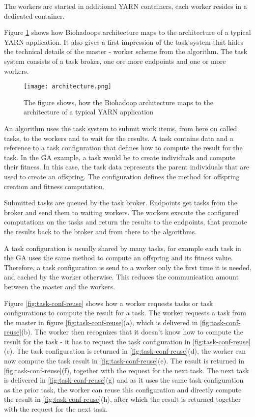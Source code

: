 The workers are started in additional YARN containers, each worker resides in a dedicated container.

Figure \ref{fig:architecture} shows how Biohadoops architecture maps to the architecture of a typical YARN application. It also gives a first impression of the task system that hides the technical details of the master - worker scheme from the algorithm. The task system consists of a task broker, one ore more endpoints and one or more workers.

\begin{figure}[ht!]
  \centering
  \texttt{[image: architecture.png]}
  \caption{The figure shows, how the Biohadoop architecture maps to the architecture of a typical YARN application}
  \label{fig:architecture}
\end{figure}

An algorithm uses the task system to submit work items, from here on called tasks, to the workers and to wait for the results. A task contains data and a reference to a task configuration that defines how to compute the result for the task. In the GA example, a task would be to create individuals and compute their fitness. In this case, the task data represents the parent individuals that are used to create an offspring. The configuration defines the method for offspring creation and fitness computation.

Submitted tasks are queued by the task broker. Endpoints get tasks from the broker and send them to waiting workers. The workers execute the configured computations on the tasks and return the results to the endpoints, that promote the results back to the broker and from there to the algorithms.

A task configuration is usually shared by many tasks, for example each task in the GA uses the same method to compute an offspring and its fitness value. Therefore, a task configuration is send to a worker only the first time it is needed, and cached by the worker otherwise. This reduces the communication amount between the master and the workers.

Figure \ref{fig:task-conf-reuse} shows how a worker requests tasks or task configurations to compute the result for a task. The worker requests a task from the master in figure \ref{fig:task-conf-reuse}(a), which is delivered in \ref{fig:task-conf-reuse}(b). The worker then recognizes that it doesn't know how to compute the result for the task - it has to request the task configuration in \ref{fig:task-conf-reuse}(c). The task configuration is returned in \ref{fig:task-conf-reuse}(d), the worker can now compute the task result in \ref{fig:task-conf-reuse}(e). The result is returned in \ref{fig:task-conf-reuse}(f), together with the request for the next task. The next task is delivered in \ref{fig:task-conf-reuse}(g) and as it uses the same task configuration as the prior task, the worker can reuse this configuration and directly compute the result in \ref{fig:task-conf-reuse}(h), after which the result is returned together with the request for the next task.


